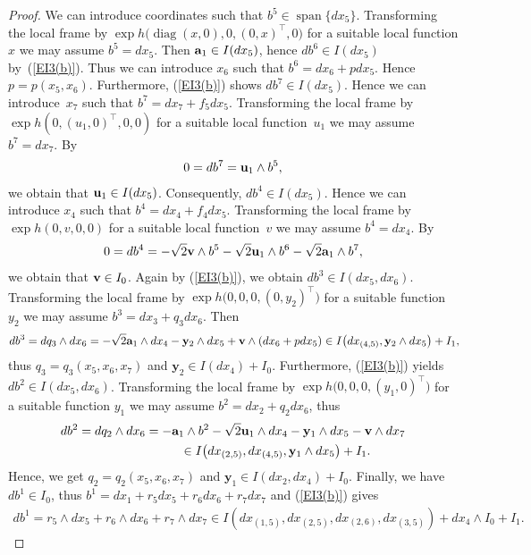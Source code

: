 \documentclass[pdftex]{sigma}
\numberwithin{equation}{section}
\newcommand\bu{{\mathbf u}}
\newcommand\by{{\mathbf y}}
\newcommand\bv{{\mathbf v}}
\newcommand{\Span}{\operatorname{span}}
\newcommand{\diag}{\operatorname{diag}}
\begin{document}
\begin{proof} We can introduce coordinates such that $b^5\in\Span\{dx_5\}$. Transforming the local frame by $\exp h\big(\diag(x,0),0,(0,x)^\top,0\big)$ for a suitable local function $x$ we may assume $b^5=dx_5$. 	 Then ${\bf a}_ 1 \in I(dx_5)$, hence $db^6\in I(dx_5)$ by~(\ref{EI3(b)}). Thus we can introduce $x_6$ such that $b^6=dx_6 +p dx_5$. Hence $p=p(x_5,x_6)$. Furthermore, (\ref{EI3(b)}) shows $db^7\in I(dx_5)$. Hence we can introduce~$x_7$ such that $b^7=dx_7+f_5 dx_5$. Transforming the local frame by $\exp h(0,(u_1,0)^\top,0,0)$ for a suitable local function~$u_1$ we may assume $b^7=dx_7$. By
\begin{gather*}
0 = d b^7 = {\bf u}_1 \wedge b^5,
\end{gather*}
we obtain that ${\bf u}_1 \in I (dx_5)$. Consequently, $db^4 \in I(dx_5)$. Hence we can introduce $x_4$ such that $b^4 = dx_4 + f_4 dx_5$. Transforming the local frame by $\exp h(0, v, 0, 0)$ for a suitable local function~$v$ we may assume $b^4 = dx_4$. By
\begin{gather*}
0 = d b^4 = - \sqrt{2} {\bf v} \wedge b^5 - \sqrt{2} {\bf u}_1 \wedge b^6 - \sqrt{2} {\bf a}_1 \wedge b^7,
\end{gather*}
we obtain that ${\bf v} \in I_0$. Again by (\ref{EI3(b)}), we obtain $db^3 \in I(dx_5,dx_6)$. Transforming the local frame by $\exp h\big(0,0,0,(0,y_2)^\top\big)$ for a suitable function $y_2$ we may assume $b^3 = dx_3 + q_3 dx_6$. Then
\begin{gather*}
db^3 = dq_3\wedge dx_6= -\sqrt2 {\bf a}_1 \wedge dx_4-\by_2\wedge dx_5+\bv\wedge (dx_6+pdx_5)
\in I\big(dx_{(4,5)}, \by_2\wedge dx_5\big)+I_1,\!
\end{gather*}
thus $q_3=q_3(x_5,x_6,x_7)$ and $\by_2\in I(dx_4)+I_0$. Furthermore, (\ref{EI3(b)}) yields $db^2\in I(dx_5,dx_6)$. Transforming the local frame by $\exp h\big(0,0,0,(y_1,0)^\top\big)$ for a suitable function $y_1$ we may assume $b^2=dx_2+q_2 dx_6$, thus
\begin{gather*}
db^2 = dq_2\wedge dx_6 = -{\bf a}_ 1 \wedge b^2 -\sqrt2 \bu_1\wedge dx_4-\by_1\wedge dx_5-\bv\wedge dx_7\\
\hphantom{db^2 = dq_2\wedge dx_6}{} \in I\big(dx_{(2,5)}, dx_{(4,5)}, \by_1\wedge dx_5\big)+I_1.
\end{gather*}
Hence, we get $q_2=q_2(x_5,x_6,x_7)$ and $\by_1\in I(dx_2, dx_4)+I_0$. Finally, we have $db^1\in I_0$, thus $b^1=dx_1+r_5dx_5+r_6dx_6+r_7dx_7$ and (\ref{EI3(b)}) gives
\begin{gather*}
db^1 = r_5\wedge dx_5+r_6\wedge dx_6+r_7\wedge dx_7
 \in I( dx_{(1,5)}, dx_{(2,5)}, dx_{(2,6)}, dx_{(3,5)} )+dx_4\wedge I_0 +I_1.
\end{gather*}


\end{proof}
\end{document}
